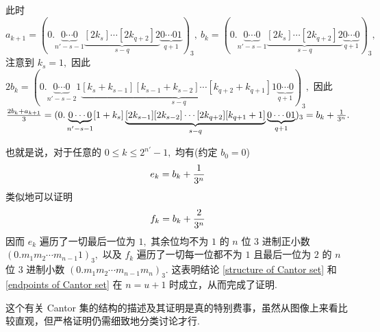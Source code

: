 \documentclass[12pt, a4paper, oneside]{book}
\numberwithin{figure}{section}
\theoremstyle{definition}
\begin{document}
此时 $a_{k+1}=(0.\underbrace{0\cdots 0}_{n'-s-1}\underbrace{[2k_s]\cdots [2k_{q+2}]2}_{s-q}\underbrace{0\cdots 01}_{q+1})_3, \ b_k=(0.\underbrace{0\cdots 0}_{n'-s-1}\underbrace{[2k_s]\cdots [2k_{q+2}]2}_{s-q}\underbrace{0\cdots 0}_{q+1})_3,$
注意到 $k_s=1,$ 因此 $2b_k=(0.\underbrace{0\cdots 0}_{n'-s-2}1\underbrace{[k_s+k_{s-1}][k_{s-1}+k_{s-2}]\cdots [k_{q+2}+k_{q+1}]1}_{s-q}\underbrace{0\cdots 0}_{q+1})_3,$ 因此 
${2b_k+a_{k+1}\over 3}=(0.\underbrace{0\cdots 0}_{n'-s-1}[1+k_s]\underbrace{[2k_{s-1}][2k_{s-2}]\cdots [2k_{q+2}][k_{q+1}+1]}_{s-q}\underbrace{0\cdots 01}_{q+1})_3=b_k+{1\over 3^{n}}.$ 

也就是说，对于任意的 $0\leq k\leq 2^{n'}-1,$ 均有(约定 $b_0=0$)
\begin{equation}
    e_k=b_k+{1\over 3^n}
\end{equation}
类似地可以证明
\begin{equation}
    f_k=b_k+{2\over 3^n}
\end{equation}
因而 $e_k$ 遍历了一切最后一位为 $1,$ 其余位均不为 $1$ 的 $n$ 位 $3$ 进制正小数 $(0.m_1m_2\cdots m_{n-1}1)_3,$ 以及 $f_k$ 遍历了一切每一位都不为 $1$ 且最后一位为 $2$ 的 $n$ 位 $3$ 进制小数 $(0.m_1m_2\cdots m_{n-1}m_n)_3.$ 这表明结论 \eqref{structure of Cantor set} 和 \eqref{endpoints of Cantor set} 在 $n=u+1$ 时成立，从而完成了证明.

这个有关 Cantor 集的结构的描述及其证明是真的特别费事，虽然从图像上来看比较直观，但严格证明仍需细致地分类讨论才行.
\end{document}
